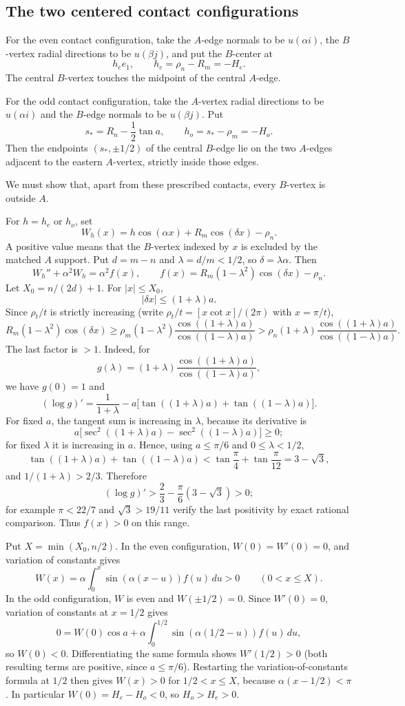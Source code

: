\documentclass[11pt]{article}
\theoremstyle{remark}
\begin{document}
\subsection{The two centered contact configurations}

For the even contact configuration, take the $A$-edge normals to be $u(\alpha i)$, the $B$-vertex radial directions to be $u(\beta j)$, and put the $B$-center at
\[
h_e e_1,\qquad h_e=\rho_n-R_m=-H_e.
\]
The central $B$-vertex touches the midpoint of the central $A$-edge.

For the odd contact configuration, take the $A$-vertex radial directions to be $u(\alpha i)$ and the $B$-edge normals to be $u(\beta j)$. Put
\[
s_*=R_n-\frac12\tan a,
\qquad h_o=s_*-\rho_m=-H_o.
\]
Then the endpoints $(s_*,\pm1/2)$ of the central $B$-edge lie on the two $A$-edges adjacent to the eastern $A$-vertex, strictly inside those edges.

We must show that, apart from these prescribed contacts, every $B$-vertex is outside $A$.

For $h=h_e$ or $h_o$, set
\[
W_h(x)=h\cos(\alpha x)+R_m\cos(\delta x)-\rho_n.
\]
A positive value means that the $B$-vertex indexed by $x$ is excluded by the matched $A$ support. Put $d=m-n$ and $\lambda=d/m<1/2$, so $\delta=\lambda\alpha$. Then
\[
W_h''+\alpha^2W_h=\alpha^2 f(x),
\qquad
f(x)=R_m(1-\lambda^2)\cos(\delta x)-\rho_n.
\tag{6.3}
\]
Let $X_0=n/(2d)+1$. For $|x|\le X_0$,
\[
|\delta x|\le(1+\lambda)a.
\]
Since $\rho_t/t$ is strictly increasing (write $\rho_t/t=[x\cot x]/(2\pi)$ with $x=\pi/t$),
\[
R_m(1-\lambda^2)\cos(\delta x)
\ge \rho_m(1-\lambda^2)
\frac{\cos((1+\lambda)a)}{\cos((1-\lambda)a)}
>\rho_n(1+\lambda)
\frac{\cos((1+\lambda)a)}{\cos((1-\lambda)a)}.
\]
The last factor is $>1$. Indeed, for
\[
g(\lambda)=(1+\lambda)\frac{\cos((1+\lambda)a)}{\cos((1-\lambda)a)},
\]
we have $g(0)=1$ and
\[
(\log g)'=\frac1{1+\lambda}-a\bigl[\tan((1+\lambda)a)+\tan((1-\lambda)a)\bigr].
\]
For fixed $a$, the tangent sum is increasing in $\lambda$, because its derivative is
\[
a\bigl[\sec^2((1+\lambda)a)-\sec^2((1-\lambda)a)\bigr]\ge0;
\]
for fixed $\lambda$ it is increasing in $a$. Hence, using $a\le\pi/6$ and $0\le\lambda<1/2$,
\[
\tan((1+\lambda)a)+\tan((1-\lambda)a)
<\tan\frac\pi4+\tan\frac\pi{12}=3-\sqrt3,
\]
and $1/(1+\lambda)>2/3$. Therefore
\[
(\log g)'>\frac23-\frac\pi6(3-\sqrt3)>0;
\]
for example $\pi<22/7$ and $\sqrt3>19/11$ verify the last positivity by exact rational comparison. Thus $f(x)>0$ on this range.

Put $X=\min(X_0,n/2)$. In the even configuration, $W(0)=W'(0)=0$, and variation of constants gives
\[
W(x)=\alpha\int_0^x\sin(\alpha(x-u))f(u)\,du>0
\qquad(0<x\le X).
\]
In the odd configuration, $W$ is even and $W(\pm1/2)=0$. Since $W'(0)=0$, variation of constants at $x=1/2$ gives
\[
0=W(0)\cos a+\alpha\int_0^{1/2}\sin(\alpha(1/2-u))f(u)\,du,
\]
so $W(0)<0$. Differentiating the same formula shows $W'(1/2)>0$ (both resulting terms are positive, since $a\le\pi/6$). Restarting the variation-of-constants formula at $1/2$ then gives $W(x)>0$ for $1/2<x\le X$, because $\alpha(x-1/2)<\pi$. In particular $W(0)=H_e-H_o<0$, so $H_o>H_e>0$.
\end{document}
